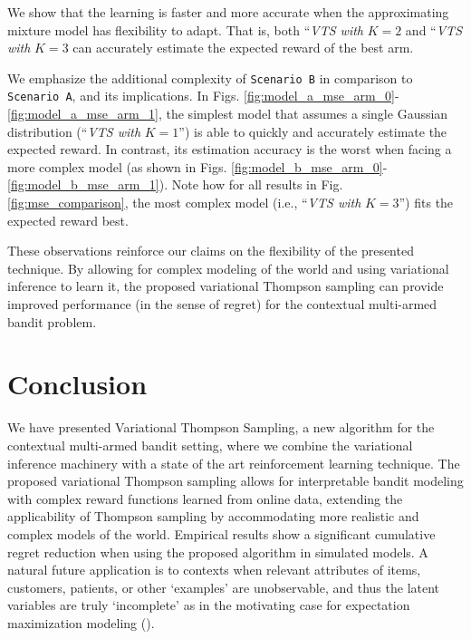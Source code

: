 \documentclass[10pt]{article}
\newcommand{\ie}{i.e., }
\begin{document}
We show that the learning is faster and more accurate when the approximating mixture model has flexibility to adapt. That is, both ``\textit{VTS with }$K=2$ and ``\textit{VTS with }$K=3$ can accurately estimate the expected reward of the best arm.

We emphasize the additional complexity of \texttt{Scenario B} in comparison to \texttt{Scenario A}, and its implications. In Figs. \ref{fig:model_a_mse_arm_0}-\ref{fig:model_a_mse_arm_1}, the simplest model that assumes a single Gaussian distribution (``\textit{VTS with }$K=1$'') is able to quickly and accurately estimate the expected reward. In contrast, its estimation accuracy is the worst when facing a more complex model (as shown in Figs. \ref{fig:model_b_mse_arm_0}-\ref{fig:model_b_mse_arm_1}). Note how for all results in Fig. \ref{fig:mse_comparison}, the most complex model (\ie ``\textit{VTS with }$K=3$'') fits the expected reward best.

These observations reinforce our claims on the flexibility of the presented technique. By allowing for complex modeling of the world and using variational inference to learn it, the proposed variational Thompson sampling can provide improved performance (in the sense of regret) for the contextual multi-armed bandit problem.

%

\section{Conclusion}
\label{sec:conclusion}

We have presented Variational Thompson Sampling, a new algorithm for the contextual multi-armed bandit setting, where we combine the variational inference machinery with a state of the art reinforcement learning technique. The proposed variational Thompson sampling allows for interpretable bandit modeling with complex reward functions learned from online data, extending the applicability of Thompson sampling by accommodating more realistic and complex models of the world. Empirical results show a significant cumulative regret reduction when using the proposed algorithm in simulated models. A natural future application is to contexts when relevant attributes of items, customers, patients, or other `examples' are unobservable, and thus the latent variables are truly `incomplete' as in the motivating case for expectation maximization modeling (\cite{j-Dempster1977}).






\end{document}
